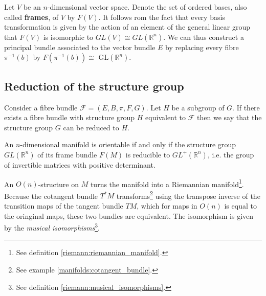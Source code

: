 	\begin{example}\label{bundles:frame_bundle}
		Let $V$ be an $n$-dimensional vector space. Denote the set of ordered bases, also called \textbf{frames}, of $V$ by $F(V)$. It follows rom the fact that every basis transformation is given by the action of an element of the general linear group that $F(V)$ is isomorphic to $GL(V)\cong GL(\mathbb{R}^n)$. We can thus construct a principal bundle associated to the vector bundle $E$ by replacing every fibre $\pi^{-1}(b)$ by $F(\pi^{-1}(b))\cong$ GL$(\mathbb{R}^n)$.
	\end{example}
	
\subsection{Reduction of the structure group}

	\begin{construct}
		Consider a fibre bundle $\mathcal{F} = (E, B, \pi, F, G)$. Let $H$ be a subgroup of $G$. If there exists a fibre bundle with structure group $H$ equivalent to $\mathcal{F}$ then we say that the structure group $G$ can be reduced to $H$.
	\end{construct}
	
	\begin{property}
		An $n$-dimensional manifold is orientable if and only if the structure group $GL(\mathbb{R}^n)$ of its frame bundle $F(M)$ is reducible to $GL^+(\mathbb{R}^n)$, i.e. the group of invertible matrices with positive determinant. 
	\end{property}
	
	\begin{example}
		An $O(n)$-structure on $M$ turns the manifold into a Riemannian manifold\footnote{See definition \ref{riemann:riemannian_manifold}.}. Because the cotangent bundle $T^*M$ transforms\footnote{See example \ref{manifolds:cotangent_bundle}.} using the transpose inverse of the transition maps of the tangent bundle $TM$, which for maps in $O(n)$ is equal to the oringinal maps, these two bundles are equivalent. The isomorphism is given by the \textit{musical isomorphisms}\footnote{See definition \ref{riemann:musical_isomorphisms}.}.
	\end{example}
	
